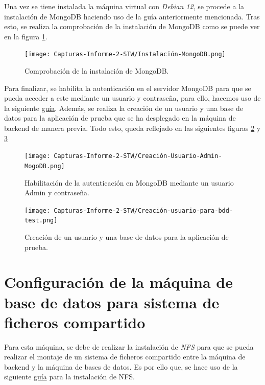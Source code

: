 \documentclass{report}
\begin{document}
  Una vez se tiene instalada la máquina virtual con \emph{Debian 12}, se procede a la instalación de MongoDB haciendo uso de la guía anteriormente mencionada. Tras esto, se realiza la comprobación de la instalación de MongoDB como se puede ver en la figura \ref{fig:Comprobación-MongoDB}.

  \begin{figure}[H]
    \centering
    \texttt{[image: Capturas-Informe-2-STW/Instalación-MongoDB.png]}
    \caption{Comprobación de la instalación de MongoDB.}
    \label{fig:Comprobación-MongoDB}
  \end{figure}

  Para finalizar, se habilita la autenticación en el servidor MongoDB para que se pueda acceder a este mediante un usuario y contraseña, para ello, hacemos uso de la siguiente \href{https://www.mongodb.com/docs/manual/tutorial/enable-authentication/}{guía}. Además, se realiza la creación de un usuario y una base de datos para la aplicación de prueba que se ha desplegado en la máquina de backend de manera previa. Todo esto, queda reflejado en las siguientes figuras \ref{fig:Habilitación-Autenticación-MongoDB} y \ref{fig:Creación-Usuario-App-MogoDB}

  \begin{figure}[H]
    \centering
    \texttt{[image: Capturas-Informe-2-STW/Creación-Usuario-Admin-MogoDB.png]}
    \caption{Habilitación de la autenticación en MongoDB mediante un usuario Admin y contraseña.}
    \label{fig:Habilitación-Autenticación-MongoDB}
  \end{figure}

  \begin{figure}[H]
    \centering
    \texttt{[image: Capturas-Informe-2-STW/Creación-usuario-para-bdd-test.png]}
    \caption{Creación de un usuario y una base de datos para la aplicación de prueba.}
    \label{fig:Creación-Usuario-App-MogoDB}
  \end{figure}

  \chapter{Configuración de la máquina de base de datos para sistema de ficheros compartido}
  Para esta máquina, se debe de realizar la instalación de \emph{NFS} para que se pueda realizar el montaje de un sistema de ficheros compartido entre la máquina de backend y la máquina de bases de datos. Es por ello que, se hace uso de la siguiente \href{https://wiki.debian.org/NFSServerSetup}{guía} para la instalación de NFS.
\end{document}
